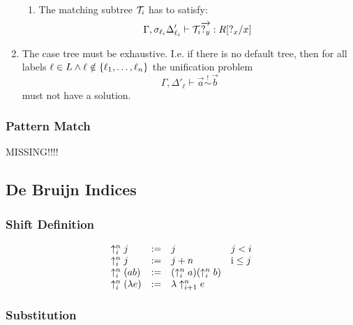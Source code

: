 \begin{enumerate}
\begin{enumerate}
            \item The matching subtree ${\mathcal T}_i$ has to satisfy:
                $$
                    \Gamma, \sigma_{\ell_i} \Delta'_{\ell_i}
                    \vdash
                    {\mathcal T}_i {\overrightarrow {{?_{y}}}}
                    :
                    R[{?_{x}} / x]
                $$

        \end{enumerate}


    \item The case tree must be exhaustive. I.e. if there is no default tree,
        then for all labels
        $
            \ell \in L
            \land
            \ell \notin {\{\ell_1, \ldots, \ell_n\}}
        $
        the unification problem
        $$
            \Gamma, \Delta'_\ell
            \vdash
            \vec a \stackrel ! \sim \vec b
        $$
        must not have a solution.
\end{enumerate}






\subsubsection{Pattern Match}


MISSING!!!!






\subsection{De Bruijn Indices}




\subsubsection{Shift Definition}


$$
\begin{array}{lllll} 
    \uparrow^{n}_{i} j &:=& j &  j < i
    \\
    \uparrow^{n}_{i} j &:=& j + n & \text i \le j
    \\
    \uparrow^{n}_{i} (a b) &:=& (\uparrow^{n}_{i} a) (\uparrow^{n}_{i} b)
    \\
    \uparrow^{n}_{i} (\lambda e)
    &:=&
    \lambda \uparrow^{n}_{i + 1} e
 \end{array}
$$




\subsubsection{Substitution}

